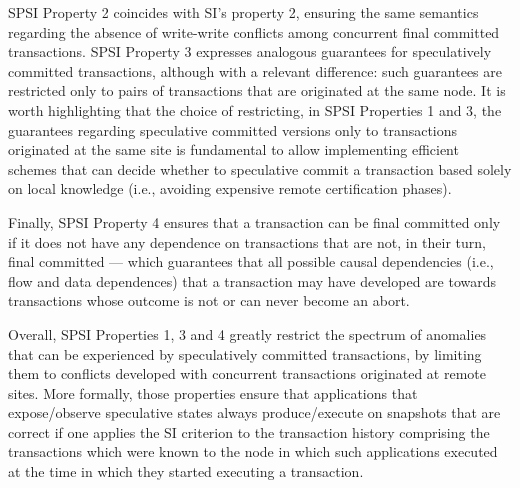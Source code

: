 SPSI Property 2 coincides with SI's property 2, ensuring the same semantics regarding the absence of write-write conflicts among concurrent final committed transactions. SPSI Property 3 expresses analogous guarantees for speculatively committed transactions, although with a relevant difference: such guarantees are restricted only to pairs of transactions that are originated at the same node. It is worth highlighting that the choice of restricting, in SPSI Properties 1 and 3, the guarantees regarding speculative committed versions only to transactions originated at the same site is fundamental to allow implementing efficient schemes that can decide whether to speculative commit a transaction based solely on local knowledge (i.e., avoiding expensive remote certification phases).

Finally, SPSI Property 4 ensures that a transaction can be final committed only if it does not have any dependence on transactions that are not, in their turn, final committed --- which guarantees that all possible causal dependencies (i.e., flow and data dependences) that a transaction may have developed are towards transactions whose outcome is not or can never become an abort.

Overall, SPSI Properties 1, 3 and 4 greatly restrict the spectrum of anomalies that can be experienced by speculatively committed transactions, by limiting them to conflicts developed with concurrent transactions originated at remote sites. More formally, those properties ensure that applications that expose/observe speculative states always produce/execute on snapshots  that are correct if one applies the SI criterion to the transaction history comprising the transactions which were known to the node in which such applications executed at the time in which they started executing a transaction. 

